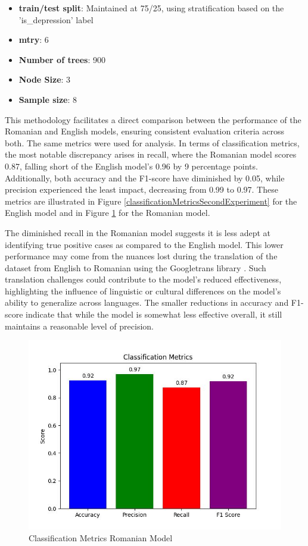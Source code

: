 \documentclass[3p,times,procedia]{elsarticle}
\begin{document}
\begin{itemize}
\item \textbf{train/test split}: Maintained at 75/25, using stratification based on the 'is\_depression' label
\item \textbf{mtry}: 6
\item \textbf{Number of trees}: 900
\item \textbf{Node Size}: 3
\item \textbf{Sample size}: 8
\end{itemize}

This methodology facilitates a direct comparison between the performance of the Romanian and English models, ensuring consistent evaluation criteria across both. The same metrics were used for analysis. In terms of classification metrics, the most notable discrepancy arises in recall, where the Romanian model scores 0.87, falling short of the English model's 0.96 by 9 percentage points. Additionally, both accuracy and the F1-score have diminished by 0.05, while precision experienced the least impact, decreasing from 0.99 to 0.97. These metrics are illustrated in Figure \ref{classificationMetricsSecondExperiment} for the English model and in Figure \ref{classificationMetricsRomanianExperiment} for the Romanian model.

The diminished recall in the Romanian model suggests it is less adept at identifying true positive cases as compared to the English model. This lower performance may come from the nuances lost during the translation of the dataset from English to Romanian using the Googletrans library \cite{googletranslib}. Such translation challenges could contribute to the model’s reduced effectiveness, highlighting the influence of linguistic or cultural differences on the model’s ability to generalize across languages. The smaller reductions in accuracy and F1-score indicate that while the model is somewhat less effective overall, it still maintains a reasonable level of precision.

\begin{figure}[htbp]
	\centering
		\includegraphics[scale=0.8]{./figures/metrics/experimentRomanian/classificationMetrics.jpg}
	\caption{Classification Metrics Romanian Model}
	\label{classificationMetricsRomanianExperiment}
\end{figure}
\end{document}
